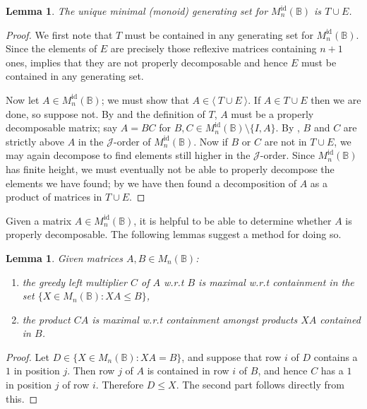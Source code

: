 \documentclass[11pt]{article}
\newtheorem{lemma}[thm]{Lemma}
\numberwithin{equation}{section}
\newcommand{\set}[2]{\ensuremath{\{#1 : #2 \}}}
\newcommand{\genset}[1]{\ensuremath{\langle\: #1 \:\rangle}}
\newcommand{\B}{\mathbb{B}}
\newcommand{\Bn}{M_n(\B)}
\newcommand{\Refn}{M_n^{\text{id}}(\B)}
\newcommand{\J}{\mathscr{J}}
\begin{document}
\begin{lemma}
  The unique minimal (monoid) generating set for $\Refn$ is $T \cup E$.
\end{lemma}
\begin{proof}
  We first note that $T$ must be contained in any generating set for $\Refn$.
  Since the elements of $E$ are precisely those reflexive matrices containing
  $n + 1$ ones,  implies that they are not
  properly decomposable and hence $E$ must be contained in any generating set.

  Now let $A \in \Refn$; we must show that $A \in \genset{T \cup E}$. If $A \in
  T \cup E$ then we are done, so suppose not. By
   and the definition of $T$, $A$ must be a
  properly decomposable matrix; say $A = BC$ for $B, C \in \Refn\setminus\{I,
  A\}$. By , $B$ and $C$ are strictly above $A$ in
  the $\J$-order of $\Refn$. Now if $B$ or $C$ are not in $T \cup E$, we may
  again decompose to find elements still higher in the $\J$-order. Since $\Refn$
  has finite height, we must eventually not be able to properly decompose the
  elements we have found; by  we have then
  found a decomposition of $A$ as a product of matrices in $T \cup E$.
\end{proof}

Given a matrix $A \in \Refn$, it is helpful to be able to determine whether $A$
is properly decomposable. The following lemmas suggest a method for doing so.

\begin{lemma}
  Given matrices $A, B \in \Bn$:
  \begin{enumerate}
    \item
      the greedy left multiplier $C$ of $A$ w.r.t $B$ is maximal w.r.t
      containment in the set $\set{X \in \Bn}{XA \leq B}$,
    \item 
      the product $CA$ is maximal w.r.t containment amongst products $XA$
      contained in $B$.
  \end{enumerate}
\end{lemma}
\begin{proof}
  Let $D \in \set{X \in \Bn}{XA = B}$, and suppose that row $i$ of $D$ contains
  a $1$ in position $j$. Then row $j$ of $A$ is contained in row $i$ of $B$, and
  hence $C$ has a $1$ in position $j$ of row $i$. Therefore $D \leq X$. The
  second part follows directly from this.
\end{proof}
\end{document}
